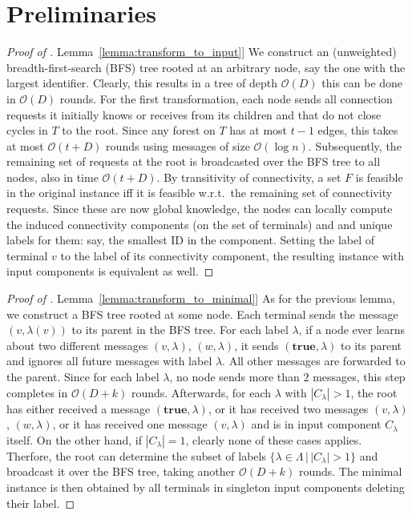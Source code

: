 \documentclass[letterpaper,11pt]{article}
\newcommand{\namedref}[2]{\hyperref[#2]{#1~\ref*{#2}}}
\newcommand{\lemmaref}[1]{\namedref{Lemma}{#1}}
\newcommand{\BO}{\mathcal{O}}
\newcommand{\Comp}{\lambda}
\newcommand{\true}{\mathbf{true}}
\begin{document}
\section{Preliminaries}
\begin{proof}[Proof of \lemmaref{lemma:transform_to_input}]
  We construct an (unweighted) breadth-first-search (BFS) tree rooted at
an arbitrary node, say the one with the largest identifier. Clearly,
this results in a tree of depth $\BO(D)$ this can be done in $\BO(D)$
rounds. For the first transformation, each node sends all connection
requests it initially knows or receives from its children and that do
not close cycles in $T$ to the root. Since any forest on $T$ has at
most $t-1$ edges, this takes at most $\BO(t+D)$ rounds using messages
of size $\BO(\log n)$. Subsequently, the remaining set of requests at
the root is broadcasted over the BFS tree to all nodes, also in time
$\BO(t+D)$. By transitivity of connectivity, a set $F$ is feasible in
the original instance iff it is feasible w.r.t.\ the remaining set of
connectivity requests. Since these are now global knowledge, the nodes
can locally compute the induced connectivity components (on the set of
terminals) and and unique labels for them: say, the smallest ID in the
component. Setting the label of
terminal $v$ to the label of its connectivity component, the resulting
instance with input components is equivalent as well. 
\end{proof}
\begin{proof}[Proof of \lemmaref{lemma:transform_to_minimal}]
As for the previous lemma, we construct a BFS tree rooted at some
node. Each terminal sends the message $(v,\Comp(v))$ to its parent in the
BFS tree. For each label $\Comp$, if a node ever learns about two
different messages $(v,\Comp)$, $(w,\Comp)$, it sends $(\true,\Comp)$ to
its parent and ignores all future messages with label $\Comp$. All other
messages are forwarded to the parent. Since for each label $\Comp$, no
node sends more than $2$ messages, this step completes in $\BO(D+k)$
rounds. Afterwards, for each $\Comp$ with $|C_{\Comp}|>1$, the root
has either received a message $(\true,\Comp)$, or it has received two messages
$(v,\Comp)$, $(w,\Comp)$, or it has received one message $(v,\Comp)$ and is
in input component $C_{\Comp}$ itself. On the other hand, if
$|C_{\Comp}|=1$, clearly none of these cases applies. Therfore, the
root can determine the subset of labels $\{\Comp\in
\Lambda\,|\,|C_{\Comp}|>1\}$ and broadcast it over the BFS tree,
taking another $\BO(D+k)$ rounds. The minimal instance is then
obtained by all terminals in singleton input components deleting their
label. 
\end{proof}
\end{document}
